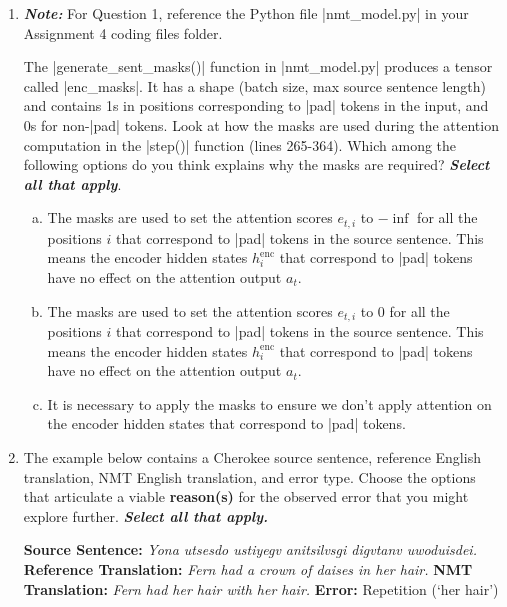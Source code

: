 \begin{enumerate}[1.]
\item {}

{\em {\bf Note:}} For Question 1, reference the Python file |nmt_model.py| in your Assignment 4 coding files folder. 

The |generate_sent_masks()| function in |nmt_model.py| produces a tensor called |enc_masks|. It has a shape (batch size, max source sentence length) and contains 1s in positions corresponding to |pad| tokens in the input, and 0s for non-|pad| tokens. Look at how the masks are used during the attention computation in the |step()| function (lines 265-364). Which among the following options do you think explains why the masks are required? {\em{\bf Select all that apply}}.

\begin{enumerate}[(a)]
\item The masks are used to set the attention scores $e_{t,i}$ to $-\inf$ for all the positions $i$ that correspond to |pad| tokens in the source sentence. This means the encoder hidden states $h_i^\text{enc}$ that correspond to |pad| tokens have no effect on the attention output $a_t$.
\item The masks are used to set the attention scores $e_{t,i}$ to 0 for all the positions $i$ that correspond to |pad| tokens in the source sentence. This means the encoder hidden states $h_i^\text{enc}$ that correspond to |pad| tokens have no effect on the attention output $a_t$.
\item It is necessary to apply the masks to ensure we don’t apply attention on the encoder hidden states that correspond to |pad| tokens. 
\end{enumerate}


\item {}

The example below contains a Cherokee source sentence, reference English translation, NMT English translation, and error type. Choose the options that articulate a viable {\bf reason(s)} for the observed error that you might explore further. {\bf {\em Select all that apply.}}

{\bf Source Sentence:} {\em Yona utsesdo ustiyegv anitsilvsgi digvtanv uwoduisdei.}
\newline
{\bf Reference Translation:} {\em Fern had a crown of daises in her hair.}
\newline
{\bf NMT Translation:} {\em Fern had her hair with her hair.}
\newline
{\bf Error:} Repetition (`her hair')
\newline


\end{enumerate}
